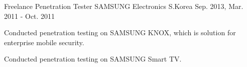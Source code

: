\begin{cventries}
  \cventry
  {Freelance Penetration Tester} %
  {SAMSUNG Electronics} %
  {S.Korea} %
  {Sep. 2013, Mar. 2011 - Oct. 2011} %
  {
    \begin{cvitems} %
    \item {Conducted penetration testing on SAMSUNG KNOX, which is solution for enterprise mobile security.}
    \item {Conducted penetration testing on SAMSUNG Smart TV.}
    \end{cvitems}
  }

\end{cventries}

